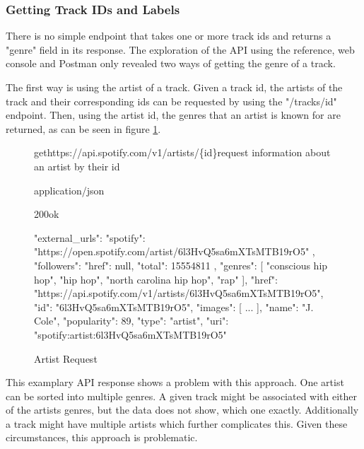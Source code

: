 \subsubsection{Getting Track IDs and Labels}

There is no simple endpoint that takes one or more track ids and returns  a "genre" field
in its response. The exploration of the API using the reference, web console and Postman only revealed
two ways of getting the genre of a track. 

The first way is using the artist of a track. Given a track id, the artists of the track and their corresponding
ids can be requested by using the "/tracks/{id}" endpoint. Then, using the artist id, the genres that an
artist is known for are returned, as can be seen in figure \ref{fig:Artist Request}.

\begin{figure}[H]
    \caption{Artist Request}
	\label{fig:Artist Request}
\begin{apiRoute}{get}{https://api.spotify.com/v1/artists/\{id\}}{request information about an artist by their id}
    \begin{routeParameter}
    \end{routeParameter}
    \begin{routeResponse}{application/json}
        \begin{routeResponseItem}{200}{ok}
            \begin{routeResponseItemBody}
{
    "external_urls": {
        "spotify": "https://open.spotify.com/artist/6l3HvQ5sa6mXTsMTB19rO5"
    },
    "followers": {
        "href": null,
        "total": 15554811
    },
    "genres": [
        "conscious hip hop",
        "hip hop",
        "north carolina hip hop",
        "rap"
    ],
    "href": "https://api.spotify.com/v1/artists/6l3HvQ5sa6mXTsMTB19rO5",
    "id": "6l3HvQ5sa6mXTsMTB19rO5",
    "images": [
        ...
    ],
    "name": "J. Cole",
    "popularity": 89,
    "type": "artist",
    "uri": "spotify:artist:6l3HvQ5sa6mXTsMTB19rO5"
    }
            \end{routeResponseItemBody}
        \end{routeResponseItem}
    \end{routeResponse}
\end{apiRoute}
\end{figure}

This examplary API response shows a problem with this approach. One artist can be sorted
into multiple genres.
A given track might be associated with either of the artists genres, but the data does
not show, which one exactly.
Additionally a track might have multiple artists which further complicates this.
Given these circumstances, this approach is problematic.

